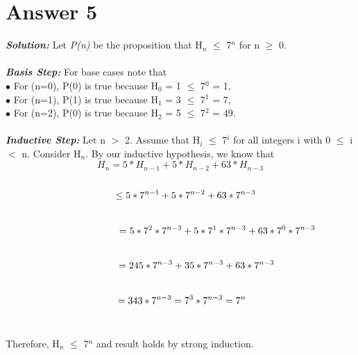 \documentclass[12pt]{article}
\begin{document}
\section*{Answer 5}
\hspace*{0.6cm} \textbf{\textit{Solution:} } Let \textit{P(n)} be the proposition that H$_n$ $\leq$  7$^n$ for n $\geq$ 0. \\
\vspace*{0.2cm}\\
\hspace*{0.6cm} \textbf{\textit{Basis Step:} } For base cases note that\\
$\bullet$ For (n=0), P(0) is true because H$_0$ = 1 $\leq$  7$^0$ = 1,\\
$\bullet$ For (n=1), P(1) is true because H$_1$ = 3 $\leq$  7$^1$ = 7,\\
$\bullet$ For (n=2), P(0) is true because H$_2$ = 5 $\leq$  7$^2$ = 49.\\
\vspace*{0.2cm}\\
\hspace*{0.6cm} \textbf{\textit{Inductive Step:} } Let n $>$ 2. Assume that H$_i$ $\leq$  7$^i$ for all integers i with 0 $\leq$ i $<$ n. Consider H$_n$. By our inductive hypothesis, we know that\\
\[H_n = 5*H_{n-1} + 5*H_{n-2} + 63*H_{n-3}\]\\
\[\hspace*{0.4cm}\leq 5*7^{n-1} + 5*7^{n-2} + 63*7^{n-3}\]\\
\[\hspace*{2.7cm}= 5*7^{2}*7^{n-3} + 5*7^{1}*7^{n-3} + 63*7^{0}*7^{n-3}\]\\
\[\hspace*{1.2cm}= 245*7^{n-3} + 35*7^{n-3} + 63*7^{n-3}\]\\
\[\hspace*{0.1cm}= 343*7^{n-3} = 7^{3}*7^{n-3} = 7^{n}\]\\
\vspace*{0.2cm}\\
Therefore, H$_n$ $\leq$  7$^n$ and result holds by strong induction.\\
\end{document}
